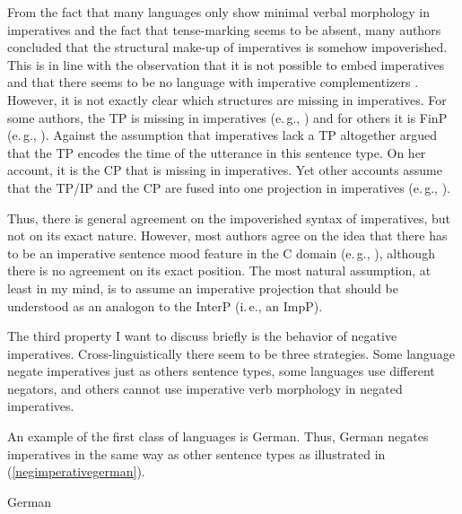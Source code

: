 From the fact that many languages only show minimal verbal morphology in imperatives and the fact that tense-marking seems to be absent, many authors concluded that the structural make-up of imperatives is somehow impoverished. This is in line with the observation that it is not possible to embed imperatives \citep[78]{katz1964theory} and that there seems to be no language with imperative complementizers \citep[281]{konig2007speech}. However, it is not exactly clear which structures are missing in imperatives. For some authors, the TP is missing in imperatives (e.\,g., \citealt{zanuttini1991syntactic}) and for others it is FinP (e.\,g., \citealt{platzack1998subject}). Against the assumption that imperatives lack a TP altogether \citet{jensen2007favour} argued that the TP encodes the time of the utterance in this sentence type. On her account, it is the CP that is missing in imperatives. Yet other accounts assume that the TP/IP and the CP are fused into one projection in imperatives (e.\,g., \citealt{wratil2005syntax}).

Thus, there is general agreement on the impoverished syntax of imperatives, but not on its exact nature. However, most authors agree on the idea that there has to be an imperative sentence mood feature in the C domain (e.\,g., \citealt{rivero1995imperatives, zanuttini1997negation, platzack1998subject, potsdam2007analysing}), although there is no agreement on its exact position. The most natural assumption, at least in my mind, is to assume an imperative projection that should be understood as an analogon to the InterP (i.\,e., an ImpP). 

The third property I want to discuss briefly is the behavior of negative imperatives. Cross-linguistically there seem to be three strategies. Some language negate imperatives just as others sentence types, some languages use different negators, and others cannot use imperative verb morphology in negated imperatives. 

An example of the first class of languages is German. Thus, German negates imperatives in the same way as other sentence types as illustrated in (\ref{negimperativegerman}). 

\begin{exe}
\ex German\label{negimperativegerman}
\begin{xlist}
\end{xlist}
\end{exe}

